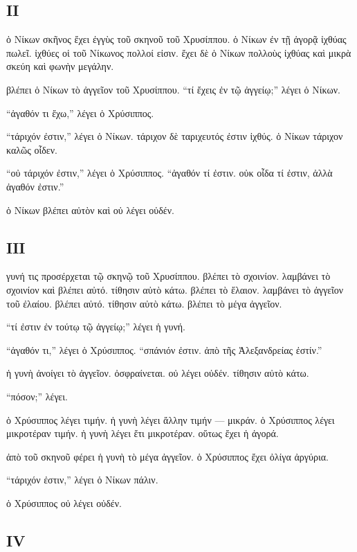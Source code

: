 \documentclass[a4paper]{report}
\begin{document}
\subsection{ΙΙ}\label{ux3b9ux3b9-1}

ὁ Νίκων σκῆνος ἔχει ἐγγὺς τοῦ σκηνοῦ τοῦ Χρυσίππου. ὁ Νίκων ἐν τῇ ἀγορᾷ
ἰχθύας πωλεῖ. ἰχθύες οἱ τοῦ Νίκωνος πολλοί εἰσιν. ἔχει δὲ ὁ Νίκων
πολλοὺς ἰχθύας καὶ μικρὰ σκεύη καὶ φωνὴν μεγάλην.

βλέπει ὁ Νίκων τὸ ἀγγεῖον τοῦ Χρυσίππου. ``τί ἔχεις ἐν τῷ ἀγγείῳ;''
λέγει ὁ Νίκων.

``ἀγαθόν τι ἔχω,'' λέγει ὁ Χρύσιππος.

``τάριχόν ἐστιν,'' λέγει ὁ Νίκων. τάριχον δὲ ταριχευτός ἐστιν ἰχθύς. ὁ
Νίκων τάριχον καλῶς οἶδεν.

``οὐ τάριχόν ἐστιν,'' λέγει ὁ Χρύσιππος. ``ἀγαθόν τί ἐστιν. οὐκ οἶδα τί
ἐστιν, ἀλλὰ ἀγαθόν ἐστιν.''

ὁ Νίκων βλέπει αὐτὸν καὶ οὐ λέγει οὐδέν.

\subsection{ΙΙΙ}\label{ux3b9ux3b9ux3b9-1}

γυνή τις προσέρχεται τῷ σκηνῷ τοῦ Χρυσίππου. βλέπει τὸ σχοινίον.
λαμβάνει τὸ σχοινίον καὶ βλέπει αὐτό. τίθησιν αὐτὸ κάτω. βλέπει τὸ
ἔλαιον. λαμβάνει τὸ ἀγγεῖον τοῦ ἐλαίου. βλέπει αὐτό. τίθησιν αὐτὸ κάτω.
βλέπει τὸ μέγα ἀγγεῖον.

``τί ἐστιν ἐν τούτῳ τῷ ἀγγείῳ;'' λέγει ἡ γυνή.

``ἀγαθόν τι,'' λέγει ὁ Χρύσιππος. ``σπάνιόν ἐστιν. ἀπὸ τῆς Ἀλεξανδρείας
ἐστίν.''

ἡ γυνὴ ἀνοίγει τὸ ἀγγεῖον. ὀσφραίνεται. οὐ λέγει οὐδέν. τίθησιν αὐτὸ
κάτω.

``πόσον;'' λέγει.

ὁ Χρύσιππος λέγει τιμήν. ἡ γυνὴ λέγει ἄλλην τιμήν --- μικράν. ὁ
Χρύσιππος λέγει μικροτέραν τιμήν. ἡ γυνὴ λέγει ἔτι μικροτέραν. οὕτως
ἔχει ἡ ἀγορά.

ἀπὸ τοῦ σκηνοῦ φέρει ἡ γυνὴ τὸ μέγα ἀγγεῖον. ὁ Χρύσιππος ἔχει ὀλίγα
ἀργύρια.

``τάριχόν ἐστιν,'' λέγει ὁ Νίκων πάλιν.

ὁ Χρύσιππος οὐ λέγει οὐδέν.

\subsection{IV}\label{iv}
\end{document}
